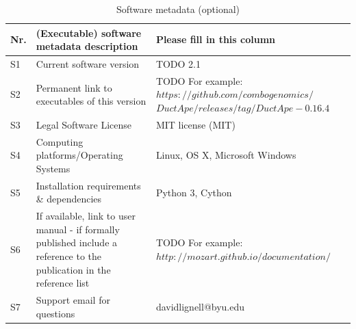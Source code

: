 \documentclass[preprint,12pt, a4paper]{elsarticle}
\begin{document}
\begin{table}[!h]
\begin{tabular}{|l|p{6.5cm}|p{6.5cm}|}
\hline
\textbf{Nr.} & \textbf{(Executable) software metadata description} & \textbf{Please fill in this column} \\
\hline
S1 & Current software version & TODO 2.1 \\
\hline
S2 & Permanent link to executables of this version  & TODO For example: $https://github.com/combogenomics/$ $DuctApe/releases/tag/DuctApe-0.16.4$ \\
\hline
S3 & Legal Software License & MIT license (MIT) \\
\hline
S4 & Computing platforms/Operating Systems & Linux, OS X, Microsoft Windows\\
\hline
S5 & Installation requirements \& dependencies & Python 3, Cython \\
\hline
S6 & If available, link to user manual - if formally published include a reference to the publication in the reference
    list & TODO For example: $http://mozart.github.io/documentation/$ \\
\hline
S7 & Support email for questions & davidlignell@byu.edu \\
\hline
\end{tabular}
\caption{Software metadata (optional)}
\label{} 
\end{table}
\end{document}
